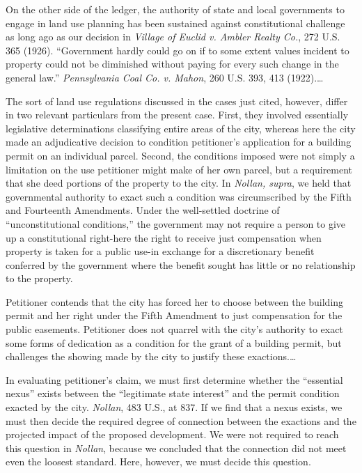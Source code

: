 On the other side of the ledger, the authority of state and local governments to
engage in land use planning has been sustained against constitutional challenge
as long ago as our decision in \textit{Village of Euclid v. Ambler Realty Co.},
272 U.S. 365 (1926). ``Government hardly could go on if to some extent values
incident to property could not be diminished without paying for every such
change in the general law.'' \textit{Pennsylvania Coal Co. v. Mahon}, 260 U.S.
393, 413 (1922).\ldots

The sort of land use regulations discussed in the cases just cited, however,
differ in two relevant particulars from the present case. First, they involved
essentially legislative determinations classifying entire areas of the city,
whereas here the city made an adjudicative decision to condition petitioner's
application for a building permit on an individual parcel. Second, the
conditions imposed were not simply a limitation on the use petitioner might make
of her own parcel, but a requirement that she deed portions of the property to
the city. In \textit{Nollan, supra}, we held that governmental authority to
exact such a condition was circumscribed by the Fifth and Fourteenth Amendments.
Under the well-settled doctrine of ``unconstitutional conditions,'' the
government may not require a person to give up a constitutional right-here the
right to receive just compensation when property is taken for a public use-in
exchange for a discretionary benefit conferred by the government where the
benefit sought has little or no relationship to the property. 

Petitioner contends that the city has forced her to choose between the building
permit and her right under the Fifth Amendment to just compensation for the
public easements. Petitioner does not quarrel with the city's authority to exact
some forms of dedication as a condition for the grant of a building permit, but
challenges the showing made by the city to justify these exactions.\ldots



In evaluating petitioner's claim, we must first determine whether the
``essential nexus'' exists between the ``legitimate state interest'' and the
permit condition exacted by the city. \textit{Nollan}, 483 U.S., at 837. If we
find that a nexus exists, we must then decide the required degree of connection
between the exactions and the projected impact of the proposed development. We
were not required to reach this question in \textit{Nollan}, because we
concluded that the connection did not meet even the loosest standard. Here,
however, we must decide this question.


